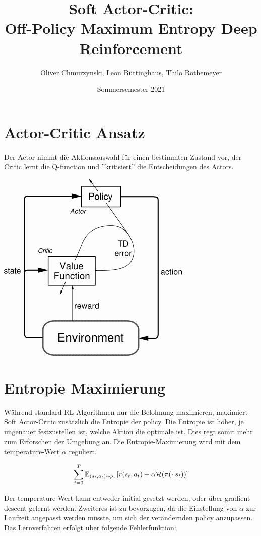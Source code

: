 \documentclass[8pt]{article}
\title{\vspace{-3cm}Soft Actor-Critic:\\
{\Large Off-Policy Maximum Entropy Deep Reinforcement}}
\author{{\normalsize Oliver Chmurzynski, Leon Büttinghaus, Thilo Röthemeyer}}
\date{{\normalsize Sommersemester 2021}}
\begin{document}
\maketitle
\thispagestyle{empty}

\begin{multicols}{2}

\section{Actor-Critic Ansatz}
Der Actor nimmt die Aktionsauswahl für einen bestimmten Zustand vor, der Critic lernt die Q-function und ''kritisiert'' die Entscheidungen des Actors.

\begin{center}\includegraphics[width=35ex]{figures/figtmp34.png}\end{center}

\section{Entropie Maximierung}
Während standard RL Algorithmen nur die Belohnung maximieren, maximiert Soft Actor-Critic zusätzlich die Entropie der policy. Die Entropie ist höher, je ungenauer festzustellen ist, welche Aktion die optimale ist. Dies regt somit mehr zum Erforschen der Umgebung an. Die Entropie-Maximierung wird mit dem temperature-Wert $\alpha$ reguliert.

\begin{equation}
	\sum_{t=0}^T \mathbb{E}_{(s_t,a_t)\sim\rho_\pi}[{\mathnormal{r}(s_t,a_t)} + \alpha \mathcal{H}(\pi(\cdot|s_t))]
\end{equation}

Der temperature-Wert kann entweder initial gesetzt werden, oder über gradient descent gelernt werden. Zweiteres ist zu bevorzugen, da die Einstellung von $\alpha$ zur Laufzeit angepasst werden müsste, um sich der verändernden policy anzupassen. Das Lernverfahren erfolgt über folgende Fehlerfunktion:


\end{multicols}
\end{document}
